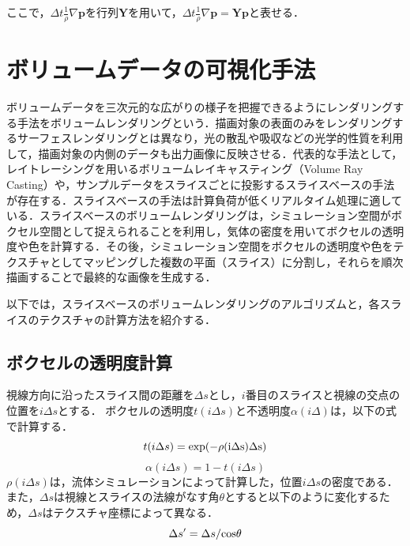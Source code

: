 \documentclass[a4j,12pt]{jreport}
\begin{document}
ここで，$\varDelta t \frac{1}{\rho}\nabla\bm{p} $を行列$\mathbf{Y}$を用いて，$\varDelta t \frac{1}{\rho}\nabla\bm{p} = \mathbf{Y}\bm{p}$と表せる．
\section{ボリュームデータの可視化手法}
ボリュームデータを三次元的な広がりの様子を把握できるようにレンダリングする手法をボリュームレンダリングという．描画対象の表面のみをレンダリングするサーフェスレンダリングとは異なり，光の散乱や吸収などの光学的性質を利用して，描画対象の内側のデータも出力画像に反映させる．代表的な手法として，レイトレーシングを用いるボリュームレイキャスティング（Volume Ray Casting）や，サンプルデータをスライスごとに投影するスライスベースの手法が存在する．スライスベースの手法は計算負荷が低くリアルタイム処理に適している．スライスベースのボリュームレンダリングは，シミュレーション空間がボクセル空間として捉えられることを利用し，気体の密度を用いてボクセルの透明度や色を計算する．その後，シミュレーション空間をボクセルの透明度や色をテクスチャとしてマッピングした複数の平面（スライス）に分割し，それらを順次描画することで最終的な画像を生成する．

以下では，スライスベースのボリュームレンダリングのアルゴリズムと，各スライスのテクスチャの計算方法を紹介する．
\subsection{ボクセルの透明度計算}
視線方向に沿ったスライス間の距離を$\Delta s$とし，$i$番目のスライスと視線の交点の位置を$i\Delta s$とする．
ボクセルの透明度$t(i\Delta s)$と不透明度$\alpha( i\Delta) $は，以下の式で計算する．
\[t( i\Delta s) = \rm{exp}( -\rho(i\Delta s) \Delta s)\]
\[\alpha( i\Delta s) = 1 - t( i\Delta s) \]
%
$\rho(i\Delta s)$は，流体シミュレーションによって計算した，位置$i\Delta s$の密度である．
%
また，$\Delta s$は視線とスライスの法線がなす角$\theta$とすると以下のように変化するため，$\Delta s$はテクスチャ座標によって異なる．
%
\begin{equation}\label{eq:cos}
\Delta s' = \Delta s / \rm{cos}\theta
\end{equation}
\end{document}
